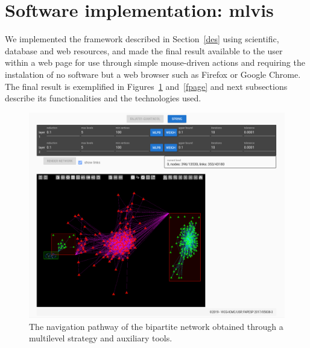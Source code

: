 \documentclass[runningheads]{llncs}
\begin{document}
\noindent 
\section{Software implementation: mlvis}\label{sof}
We implemented the framework described in Section~\ref{des} using scientific,
database and web resources,
and made the final result available to the user within a web page
for use through simple mouse-driven actions
and requiring the instalation of no software but a web browser such as Firefox or Google Chrome.
The final result is exemplified in Figures~\ref{fpage0} and~\ref{fpage} and next subsections
describe its functionalities and the technologies used.

\begin{figure}[!h]\centering
 \includegraphics[width=\textwidth]{fpage0}
  \caption{The navigation pathway of the bipartite network obtained through a multilevel strategy
  and auxiliary tools.
  }\label{fpage0}
\end{figure}
\end{document}
